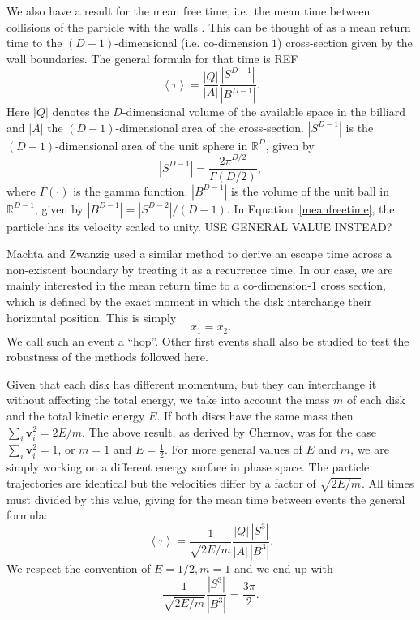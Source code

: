 \documentclass[superscriptaddress,pre,reprint,showpacs,onecolumn]{revtex4-1}
\newcommand{\mean}[1]{\left \langle #1 \right \rangle}
\newcommand{\RR}{\mathbb{R}}
\newcommand{\vv}{\mathbf{v}}
\begin{document}
We also
have a result for the mean free time, i.e.\ the mean time between 
collisions of the particle with the walls \cite{MarkChern}. 
This can be thought of as a mean return time to the $(D-1)$-dimensional 
(i.e. co-dimension $1$) cross-section given by the wall boundaries.
The general formula for that time is REF
\begin{equation}\label{meanfreetime}
 \mean{\tau} = \frac{|Q|}{|A|} \frac{|S^{D-1}|}{|B^{D-1}|}.
\end{equation}
Here $|Q|$ denotes the $D$-dimensional volume of the available 
space in the billiard and 
$|A|$ the $(D-1)$-dimensional area of the cross-section.
 $|S^{D-1}|$ is the $(D-1)$-dimensional area of the unit sphere in $\RR^D$, given by
\begin{equation}
  |S^{D-1}| = \frac{2 \pi^{D/2}}{\Gamma(D/2)},
\end{equation}
where $\Gamma(\cdot)$ is the gamma function. 
$|B^{D-1}|$ is the volume of the unit ball 
in $\RR^{D-1}$, given by $|B^{D-1}| = |S^{D-2}| / (D-1)$.
In Equation~\eqref{meanfreetime},  the particle has 
its velocity scaled to unity.  USE GENERAL VALUE INSTEAD?

Machta and Zwanzig \cite{MachtaZwan} used a similar method to derive an escape 
time across a non-existent boundary by treating it as a recurrence time.
In our case, we are mainly interested in the mean return time to 
a co-dimension-$1$ cross section, 
which is defined by the exact moment
in which the disk interchange their horizontal position. This is simply
\begin{equation} \label{condchoque}
x_1 = x_2.
\end{equation}
We call such an event a ``hop''. Other first events shall also be studied
to test the robustness of the methods followed here.

Given that each disk has different momentum, but
they can interchange it without affecting the
total energy, we take into account the mass $m$ of each disk 
and the total kinetic energy $E$.
If both discs have the same mass then $\sum_i \vv_i^2 = 2E / m$.
The above result, as derived by Chernov, 
was for the case $\sum_i \vv_i^2 = 1$, or $m=1$ and $E=\frac{1}{2}$.  
For more general values of $E$ and $m$, 
we are simply working on a different energy surface in phase space. 
The particle trajectories are identical but the velocities differ
by a factor of
$\sqrt{2E/m}$. All times must divided by this value, 
giving for
the mean time between events the general formula:
\begin{equation} \label{meantimegeneral}
  \mean{\tau} =  \frac{1}{\sqrt{2E / m}} 
\frac{|Q| \, |S^3|} {|A| \, |B^3|}.	
\end{equation}
We respect the convention of $E=1/2, m=1$ and we end up with
\begin{equation} \label{meantimegeneralredux}
   \frac{1}{\sqrt{2E / m}} 
   \frac{|S^3|}{|B^3|}=\frac{3\pi}{2}.	 
\end{equation}
\end{document}

